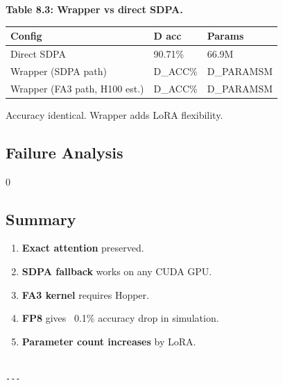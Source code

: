 \textbf{Table 8.3: Wrapper vs direct SDPA.}

\begin{table}[H]
\centering
\small
\begin{tabular}{lll}
\toprule
\textbf{Config} & \textbf{D acc} & \textbf{Params} \\
\midrule
Direct SDPA & 90.71\% & 66.9M \\
Wrapper (SDPA path) & {{D\_ACC}}\% & {{D\_PARAMS}}M \\
Wrapper (FA3 path, H100 est.) & {{D\_ACC}}\% & {{D\_PARAMS}}M \\
\bottomrule
\end{tabular}
\end{table}

Accuracy identical. Wrapper adds LoRA flexibility.

\subsection{Failure Analysis}

0

\subsection{Summary}

\begin{enumerate}
\item \textbf{Exact attention} preserved.
\item \textbf{SDPA fallback} works on any CUDA GPU.
\item \textbf{FA3 kernel} requires Hopper.
\item \textbf{FP8} gives ~0.1\% accuracy drop in simulation.
\item \textbf{Parameter count increases} by LoRA.
\end{enumerate}
\begin{lstlisting}

---
\end{lstlisting}